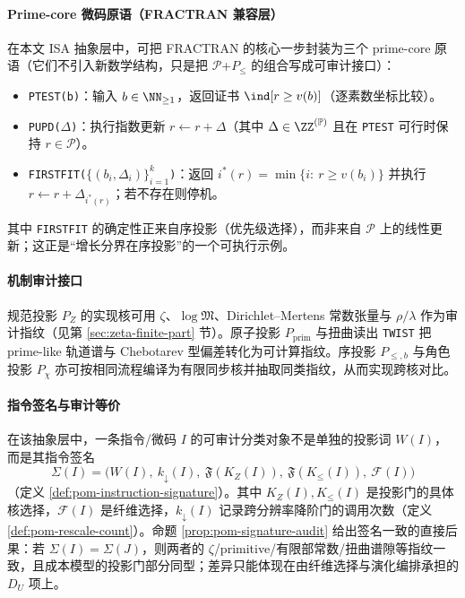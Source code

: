 \paragraph{Prime-core 微码原语（FRACTRAN 兼容层）}
在本文 ISA 抽象层中，可把 FRACTRAN 的核心一步封装为三个 prime-core 原语（它们不引入新数学结构，只是把 \(\mathcal{P}\)+\(P_{\le}\) 的组合写成可审计接口）：
\begin{itemize}
  \item \texttt{PTEST(b)}：输入 \(b\in\NN_{\ge 1}\)，返回证书 \(\ind\!\left[r\ge v(b)\right]\)（逐素数坐标比较）。
  \item \texttt{PUPD($\Delta$)}：执行指数更新 \(r\leftarrow r+\Delta\)（其中 \(\Delta\in\ZZ^{(\mathbb{P})}\) 且在 \texttt{PTEST} 可行时保持 \(r\in\mathcal{P}\)）。
  \item \texttt{FIRSTFIT($\{(b_i,\Delta_i)\}_{i=1}^k$)}：返回 \(i^\ast(r)=\min\{i:\ r\ge v(b_i)\}\) 并执行 \(r\leftarrow r+\Delta_{i^\ast(r)}\)；若不存在则停机。
\end{itemize}
其中 \texttt{FIRSTFIT} 的确定性正来自序投影（优先级选择），而非来自 \(\mathcal{P}\) 上的线性更新；这正是“增长分界在序投影”的一个可执行示例。

\paragraph{机制审计接口}
规范投影 $P_Z$ 的实现核可用 $\zeta$、$\log\mathfrak{M}$、Dirichlet--Mertens 常数张量与 $\rho/\lambda$ 作为审计指纹（见第 \ref{sec:zeta-finite-part} 节）。原子投影 $P_{\mathrm{prim}}$ 与扭曲读出 \texttt{TWIST} 把 prime-like 轨道谱与 Chebotarev 型偏差转化为可计算指纹。序投影 $P_{\le,b}$ 与角色投影 $P_\chi$ 亦可按相同流程编译为有限同步核并抽取同类指纹，从而实现跨核对比。

\paragraph{指令签名与审计等价}
在该抽象层中，一条指令/微码 $I$ 的可审计分类对象不是单独的投影词 $W(I)$，而是其指令签名
$$
\Sigma(I)=\bigl(W(I),\ k_{\downarrow}(I),\ \mathfrak{F}(K_Z(I)),\ \mathfrak{F}(K_{\le}(I)),\ \mathcal{F}(I)\bigr)
$$
（定义 \ref{def:pom-instruction-signature}）。其中 $K_Z(I),K_{\le}(I)$ 是投影门的具体核选择，$\mathcal{F}(I)$ 是纤维选择，$k_{\downarrow}(I)$ 记录跨分辨率降阶门的调用次数（定义 \ref{def:pom-rescale-count}）。命题 \ref{prop:pom-signature-audit} 给出签名一致的直接后果：若 $\Sigma(I)=\Sigma(J)$，则两者的 $\zeta$/primitive/有限部常数/扭曲谱隙等指纹一致，且成本模型的投影门部分同型；差异只能体现在由纤维选择与演化编排承担的 $D_U$ 项上。

